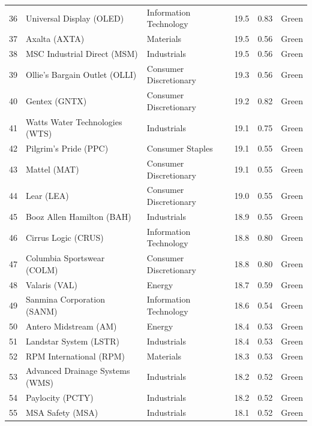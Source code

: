 \documentclass[11pt,a4paper]{article}
\begin{document}
{\begin{longtable}{r p{4.6cm} p{3cm} r r l}
36 & Universal Display (OLED) & Information Technology & 19.5 & 0.83 & \cellcolor[HTML]{C6EFCE}Green \\
37 & Axalta (AXTA) & Materials & 19.5 & 0.56 & \cellcolor[HTML]{C6EFCE}Green \\
38 & MSC Industrial Direct (MSM) & Industrials & 19.5 & 0.56 & \cellcolor[HTML]{C6EFCE}Green \\
39 & Ollie's Bargain Outlet (OLLI) & Consumer Discretionary & 19.3 & 0.56 & \cellcolor[HTML]{C6EFCE}Green \\
40 & Gentex (GNTX) & Consumer Discretionary & 19.2 & 0.82 & \cellcolor[HTML]{C6EFCE}Green \\
41 & Watts Water Technologies (WTS) & Industrials & 19.1 & 0.75 & \cellcolor[HTML]{C6EFCE}Green \\
42 & Pilgrim's Pride (PPC) & Consumer Staples & 19.1 & 0.55 & \cellcolor[HTML]{C6EFCE}Green \\
43 & Mattel (MAT) & Consumer Discretionary & 19.1 & 0.55 & \cellcolor[HTML]{C6EFCE}Green \\
44 & Lear (LEA) & Consumer Discretionary & 19.0 & 0.55 & \cellcolor[HTML]{C6EFCE}Green \\
45 & Booz Allen Hamilton (BAH) & Industrials & 18.9 & 0.55 & \cellcolor[HTML]{C6EFCE}Green \\
46 & Cirrus Logic (CRUS) & Information Technology & 18.8 & 0.80 & \cellcolor[HTML]{C6EFCE}Green \\
47 & Columbia Sportswear (COLM) & Consumer Discretionary & 18.8 & 0.80 & \cellcolor[HTML]{C6EFCE}Green \\
48 & Valaris (VAL) & Energy & 18.7 & 0.59 & \cellcolor[HTML]{C6EFCE}Green \\
49 & Sanmina Corporation (SANM) & Information Technology & 18.6 & 0.54 & \cellcolor[HTML]{C6EFCE}Green \\
50 & Antero Midstream (AM) & Energy & 18.4 & 0.53 & \cellcolor[HTML]{C6EFCE}Green \\
51 & Landstar System (LSTR) & Industrials & 18.4 & 0.53 & \cellcolor[HTML]{C6EFCE}Green \\
52 & RPM International (RPM) & Materials & 18.3 & 0.53 & \cellcolor[HTML]{C6EFCE}Green \\
53 & Advanced Drainage Systems (WMS) & Industrials & 18.2 & 0.52 & \cellcolor[HTML]{C6EFCE}Green \\
54 & Paylocity (PCTY) & Industrials & 18.2 & 0.52 & \cellcolor[HTML]{C6EFCE}Green \\
55 & MSA Safety (MSA) & Industrials & 18.1 & 0.52 & \cellcolor[HTML]{C6EFCE}Green \\

\end{longtable}}
\end{document}
